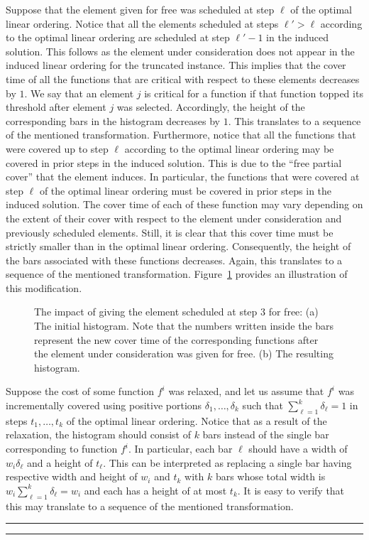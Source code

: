 \documentclass[11pt]{article}
\theoremstyle{plain}
\theoremstyle{definition}
\newcommand{\qedsymb}{\hfill{\rule{2mm}{2mm}}}
\renewenvironment{proof}{\begin{trivlist} \item[\hspace{\labelsep}{\bf \noindent Proof.\/}] }{\qedsymb\end{trivlist}}\newenvironment{proofof}[1]{\begin{trivlist} \item[\hspace{\labelsep}{\bf \noindent Proof of #1.\/}] }{\qedsymb\end{trivlist}}\newenvironment{MyEqn}[1]{\setlength\arraycolsep{2pt}\begin{eqnarray*} #1}{\end{eqnarray*}}
\begin{document}
\begin{proof}
\begin{proof}
 Suppose that the
element given for free was scheduled at step $\ell$ of the optimal
linear ordering. Notice that all the elements scheduled at steps
$\ell' > \ell$ according to the optimal linear ordering are
scheduled at step $\ell' - 1$ in the induced solution. This
follows as the element under consideration does not appear in the
induced linear ordering for the truncated instance. This implies
that the cover time of all the functions that are critical with
respect to these elements decreases by $1$. We say that an element
$j$ is critical for a function if that function topped its
threshold after element $j$ was selected. Accordingly, the height
of the corresponding bars in the histogram decreases by $1$. This
translates to a sequence of the mentioned transformation.
Furthermore, notice that all the functions that were covered up to
step $\ell$ according to the optimal linear ordering may be
covered in prior steps in the induced solution. This is due to the
``free partial cover'' that the element induces. In particular,
the functions that were covered at step $\ell$ of the optimal
linear ordering must be covered in prior steps in the induced
solution. The cover time of each of these function may vary
depending on the extent of their cover with respect to the element
under consideration and previously scheduled elements. Still, it
is clear that this cover time must be strictly smaller than in the
optimal linear ordering. Consequently, the height of the bars
associated with these functions decreases. Again, this translates
to a sequence of the mentioned transformation.
Figure~\ref{fig:Translation} provides an illustration of this
modification.

\begin{figure}[!hbt]
\centerline{  }
\caption{The impact of giving the element scheduled at step $3$
for free: (a) The initial histogram. Note that the numbers written
inside the bars represent the new cover time of the corresponding
functions after the element under consideration was given for
free. (b) The resulting histogram.} \label{fig:Translation}
\end{figure}

Suppose the cost of some function $f^i$ was relaxed, and let us
assume that $f^i$ was incrementally covered using positive
portions $\delta_1, \ldots, \delta_k$ such that $\sum_{\ell = 1}^k
\delta_\ell = 1$ in steps $t_1, \ldots, t_k$ of the optimal linear
ordering. Notice that as a result of the relaxation, the histogram
should consist of $k$ bars instead of the single bar corresponding
to function $f^i$. In particular, each bar $\ell$ should have a
width of $w_i \delta_\ell$ and a height of $t_\ell$. This can be
interpreted as replacing a single bar having respective width and
height of $w_i$ and $t_k$ with $k$ bars whose total width is $w_i
\sum_{\ell = 1}^k \delta_\ell = w_i$ and each has a height of at
most $t_k$. It is easy to verify that this may translate to a
sequence of the mentioned transformation.
\end{proof}


\end{proof}
\end{document}
